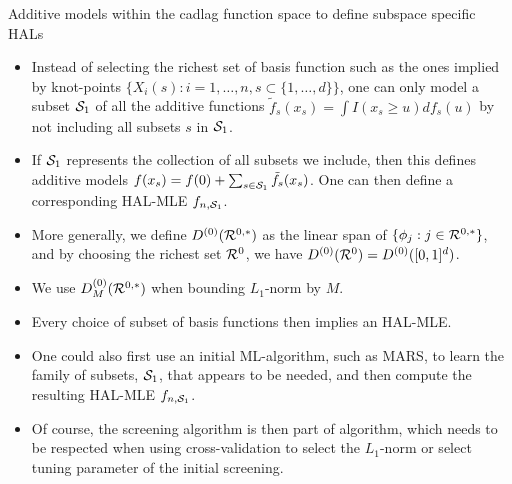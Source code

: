 \documentclass[t]{beamer}
\newlength{\wideitemsep}
\let\olditem\item
\renewcommand{\item}{\setlength{\itemsep}{\wideitemsep}\olditem}
\begin{document}
\begin{frame}{Additive models within the cadlag function space to define subspace specific HALs}
\begin{itemize}
\item Instead of selecting the richest set of basis function such as the ones implied by knot-points
$\{X_i(s): i=1,\ldots,n,s\subset\{1,\ldots,d\}\}$, one can only model a subset ${\cal S}_1$ of all the additive functions $\tilde{f}_s(x_s)=\int I(x_s\geq u) df_s(u)$  by not including all subsets $s$ in ${\cal S}_1$.
\item If ${\cal S}_1$ represents the collection of all subsets we include, then this defines additive models $f(x_s)=f(0)+\sum_{s\in {\cal S}_1}\tilde{f}_s(x_s)$. One can then define a corresponding HAL-MLE $f_{n,{\cal S}_1}$.
\item More generally, we define $D^{(0)}({\cal R}^{0,*})$ as the linear span of $\{\phi_j: j\in {\cal R}^{0,*}\}$, and by choosing the richest set ${\cal R}^0$, we have $D^{(0)}({\cal R}^0)=D^{(0)}([0,1]^d)$.
\item We use $D^{(0)}_M({\cal R}^{0,*})$ when bounding $L_1$-norm by $M$.
\end{itemize}
\end{frame}
\begin{frame}
\begin{itemize}
\item Every choice of subset of basis functions then implies an HAL-MLE.
\item One could also first use an initial ML-algorithm, such as MARS, to learn the family of subsets, ${\cal S}_1$, that appears to be needed, and then compute the resulting HAL-MLE $f_{n,{\cal S}_1}$.
\item Of course, the screening algorithm is then part of algorithm, which needs to be respected when using cross-validation to select the $L_1$-norm or select tuning parameter of the initial screening.
\end{itemize}
\end{frame}
\end{document}
